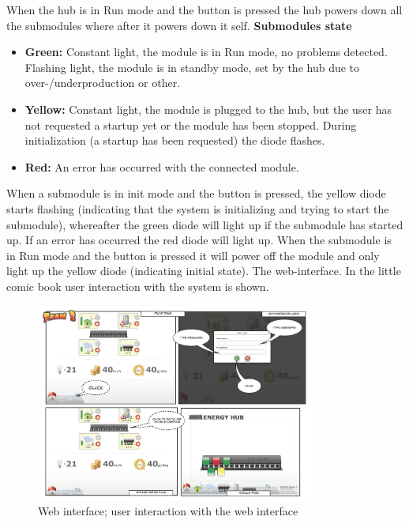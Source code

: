 		When the hub is in Run mode and the button is pressed the hub powers down all the submodules where after it powers down it self.
		\textbf{Submodules state}
		\begin{itemize}
			\item \textbf{Green: }Constant light, the module is in Run mode, no problems detected. Flashing light, the module is in standby mode, set by the hub
							due to over-/underproduction or other.
			\item \textbf{Yellow: }Constant light, the module is plugged to the hub, but the user has not requested a startup yet or the module has been stopped.
							During initialization (a startup has been requested) the diode flashes.
			\item \textbf{Red: }An error has occurred with the connected module.
		\end{itemize}
		When a submodule is in init mode and the button is pressed, the yellow diode starts flashing (indicating that the system is initializing and trying to start the submodule), whereafter
		the green diode will light up if the submodule has started up. If an error has occurred the red diode will light up. 
		When the submodule is in Run mode and the button is pressed it will power off the module and only light up the yellow diode (indicating initial state).
		The web-interface. In the little comic book user interaction with the system is shown.
		\begin{figure}[h!]		%
			\begin{centering}
				 \includegraphics[width=0.82\textwidth]{images/web_interface1.jpg}
				\caption{Web interface; user interaction with the web interface}
		 	\end{centering}
		\end{figure}

